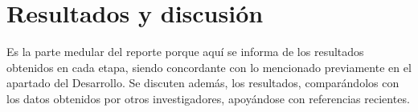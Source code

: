 \chapter{Resultados y discusión}
Es la parte medular del reporte porque aquí se informa de los resultados obtenidos en cada etapa, siendo concordante con lo mencionado previamente en el apartado del Desarrollo. Se discuten además, los resultados, comparándolos con los datos obtenidos por otros investigadores, apoyándose  con referencias recientes. 

\lipsum[2-4]

\lipsum[2-4]

\lipsum[2-4]